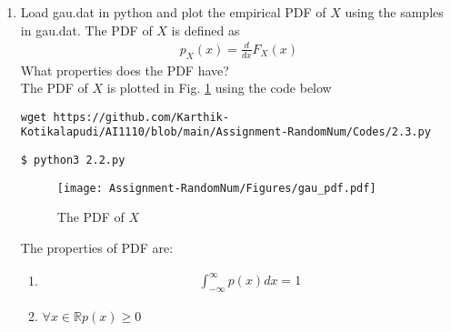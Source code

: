 \documentclass[journal,12pt,twocolumn]{IEEEtran}
\renewcommand\thesection{\arabic{section}}
\begin{document}
\begin{enumerate}[label=\thesection.\arabic*
,ref=\thesection.\theenumi]
\item
Load gau.dat in python and plot the empirical PDF of $X$ using the samples in gau.dat. The PDF of $X$ is defined as
\begin{align}
p_{X}(x) = \frac{d}{dx}F_{X}(x)
\end{align}
What properties does the PDF have?
\\
\solution The PDF of $X$ is plotted in Fig. \ref{fig:gauss_pdf} using the code below
\begin{lstlisting}
wget https://github.com/Karthik-Kotikalapudi/AI1110/blob/main/Assignment-RandomNum/Codes/2.3.py
\end{lstlisting}
\begin{lstlisting}
$ python3 2.2.py
\end{lstlisting}
\begin{figure}[ht!]
\centering
\texttt{[image: Assignment-RandomNum/Figures/gau\_pdf.pdf]}
\caption{The PDF of $X$}
\label{fig:gauss_pdf}
\end{figure}
The properties of PDF are:
\begin{enumerate}
\item 
\begin{align}
\int_{-\infty}^{\infty}p(x)dx = 1
\end{align}
\item
$\forall x\in \mathbb{R} p(x) \ge 0$
\end{enumerate}


\end{enumerate}
\end{document}
